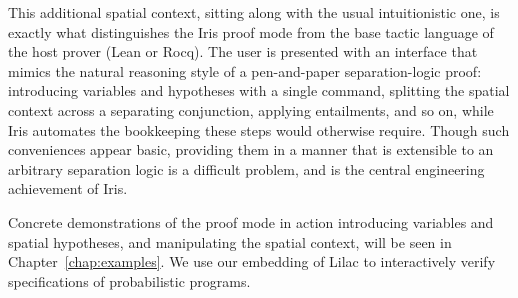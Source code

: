 This additional spatial context, sitting along with the usual intuitionistic one, is exactly what distinguishes the Iris proof mode from the base tactic language
of the host prover (Lean or Rocq). The user is presented with an interface that mimics the natural reasoning style of a pen-and-paper separation-logic proof:
introducing variables and hypotheses with a single command, splitting the spatial context across a separating conjunction, applying entailments, and so on, while
Iris automates the bookkeeping these steps would otherwise require. Though such conveniences appear basic, providing them in a manner that is extensible to an arbitrary
separation logic is a difficult problem, and is the central engineering achievement of Iris.

Concrete demonstrations of the proof mode in action introducing variables and spatial hypotheses, and manipulating the spatial context, will be seen in
Chapter~\ref{chap:examples}. We use our embedding of Lilac to interactively verify specifications of probabilistic programs. 
